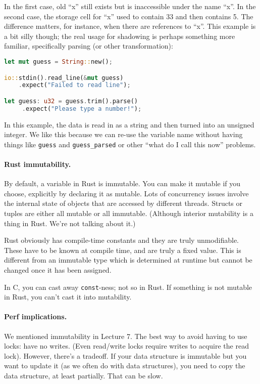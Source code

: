 In the first case, old ``x'' still exists but is inaccessible under the name ``x''.
In the second case, the storage cell for ``x'' used to contain 33 and then contains 5.
The difference matters, for instance, when there are references to ``x''. This example is a bit silly though; the real usage for shadowing is perhaps something more familiar, specifically parsing (or other transformation): 

\begin{lstlisting}[language=Rust]
let mut guess = String::new();

io::stdin().read_line(&mut guess)
    .expect("Failed to read line");

let guess: u32 = guess.trim().parse()
     .expect("Please type a number!");
\end{lstlisting}

In this example, the data is read in as a string and then turned into an unsigned integer. We like this because we can re-use the variable name without having things like \texttt{guess} and \texttt{guess\_parsed} or other ``what do I call this now'' problems.

\paragraph{Rust immutability.} 
By default, a variable in Rust is immutable. You can make it mutable if you choose, explicitly by declaring it as mutable. Lots of concurrency issues involve the internal state of objects that are accessed by different threads. Structs or tuples are either all mutable or all immutable. (Although interior mutability is a thing in Rust. We're not talking about it.)

Rust obviously has compile-time constants and they are truly unmodifiable. These have to be known at compile time, and are truly a fixed value. This is different from an immutable type which is determined at runtime but cannot be changed once it has been assigned.

In C, you can cast away {\tt const}-ness; not so in Rust.
If something is not mutable in Rust, you can't cast it into mutability.


\paragraph{Perf implications.}
We mentioned immutability in Lecture 7. The best way to avoid having
to use locks: have no writes. (Even read/write locks require writes to acquire
the read lock). However, there's a tradeoff. If your
data structure is immutable but you want to update it (as we often do
with data structures), you need to copy the data structure, at least
partially. That can be slow.


